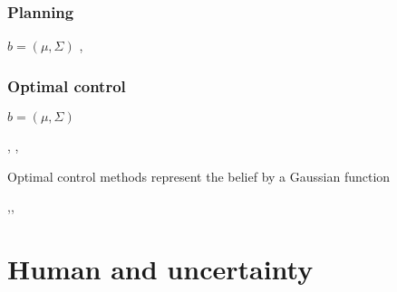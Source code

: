 \subsubsection{Planning}
$b = (\mu,\Sigma)$
\cite{Quadrator_2008},\cite{BelRoadMap_2009}


\subsubsection{Optimal control}
$b = (\mu,\Sigma)$
 
\cite{Erez10ascalable},
\cite{mc_update_ppomdps}, 
\cite{Platt-RSS-10}

 

Optimal control methods represent the belief by a Gaussian function 


\cite{Bayesian_explor_exploit_2009},\cite{Spaan05icra},\cite{Thrun_2005}
 

\cite{Rand_belief_space_replanning}
 
 
 \cite{Ross08onlineplanning}
 
 \cite{Macro_uncertainty_2011}


\section{Human and uncertainty}






% 
%
%	
%
%
%




